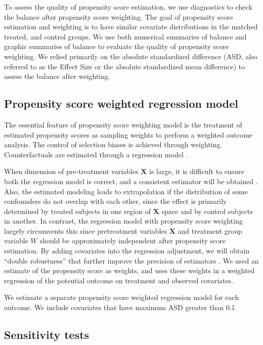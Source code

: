 To assess the quality of propensity score estimation, we use diagnostics to check the balance after propensity score weighting. The goal of propensity score estimation and weighting is to have similar covariate distributions in the matched treated, and control groups. We use both numerical summaries of balance and graphic summaries of balance to evaluate the quality of propensity score weighting. We relied primarily on the absolute standardized difference (ASD, also referred to as the Effect Size or the absolute standardized mean difference) to assess the balance after weighting. 

\subsection{Propensity score weighted regression model}
The essential feature of propensity score weighting model is the treatment of estimated propensity scores as sampling weights to perform a weighted outcome analysis. The control of selection biases is achieved through weighting. Counterfactuals are estimated through a regression model \citep{guo2009propensity}.

When dimension of pre-treatment variables $\textbf{X}$ is large, it is difficult to ensure both the regression model is correct, and a consistent estimator will be obtained \citep{rubin1997estimating}. Also, the estimated modeling leads to extrapolation if the distribution of some confounders do not overlap with each other, since the effect is primarily determined by treated subjects in one region of $\textbf{X}$ space and by control subjects in another. In contrast, the regression model with propensity score weighting largely circumvents this since pretreatment variables $\textbf{X}$ and treatment group variable $W$ should be approximately independent after propensity score estimation. By adding covariates into the regression adjustment, we will obtain ``double robustness'' that further improve the precision of estimators \citep{lunceford2004stratification}. We used an estimate of the propensity score as weights, and uses these weights in a weighted regression of the potential outcome on treatment and observed covariates.

We estimate a separate propensity score weighted regression model for each outcome. We include covariates that have maximum ASD greater than 0.1. 

\subsection{Sensitivity tests}

